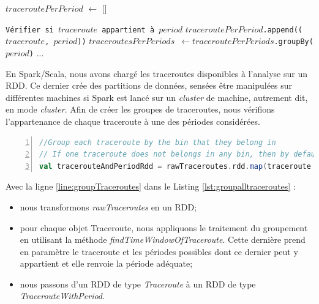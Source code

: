 \begin{algorithm}[H]
	\caption{Groupement des traceroutes en Spark}
	\label{group-data-sparkscala}
	\begin{algorithmic}[1]
    \State $ traceroutePerPeriod $  $\gets$ [] \label{initate-list}
	
			\State \texttt{Vérifier si  $traceroute$ appartient à  $period$}
		\EndFor
		\State \texttt{$ traceroutePerPeriod $.append(($ traceroute $, $period$))}
	\EndFor  \label{finloop1}
	\State \texttt{$ traceroutesPerPeriods $ $\gets$$ traceroutePerPeriods $.groupBy($period$)} \label{groupby}
	\label{begin-groupby}
	\State ... 
	\EndFor \label{end-groupby}

\end{algorithmic}
\end{algorithm}

En Spark/Scala, nous avons chargé les traceroutes disponibles à l'analyse sur un RDD. Ce dernier crée des partitions de données, sensées être manipulées sur différentes machines si Spark est lancé sur un \textit{cluster} de machine, autrement dit, en mode \textit{cluster}. Afin de créer les groupes de traceroutes, nous vérifions l'appartenance de chaque traceroute à une des périodes considérées.

\begin{lstlisting}[language=scala,firstnumber=1, caption={},label={lst:groupalltraceroutes}, basicstyle = \small,escapechar=|,numbers=left,
stepnumber=1]
//Group each traceroute by the bin that they belong in 
// If one traceroute does not belongs in any bin, then by default it belongs to the bin 0
val tracerouteAndPeriodRdd = rawTraceroutes.rdd.map(traceroute => TracerouteWithTimewindow(traceroute, findTimeWindowOfTraceroute(traceroute, rangeDatesTimewindows)))|\label{line:groupTraceroutes}|
\end{lstlisting}

Avec la ligne \ref{line:groupTraceroutes} dans le Listing \ref{lst:groupalltraceroutes} :

\begin{itemize}
	\item nous transformons  \textit{rawTraceroutes}  en un RDD;
	\item pour chaque objet Traceroute, nous appliquons le traitement du groupement en utilisant la méthode \textit{findTimeWindowOfTraceroute}. Cette dernière prend en paramètre le traceroute et les périodes possibles dont ce dernier peut y appartient et elle renvoie la période adéquate;
	\item nous passons d'un RDD de type \textit{Traceroute} à un RDD de type \textit{TracerouteWithPeriod}.
\end{itemize}


